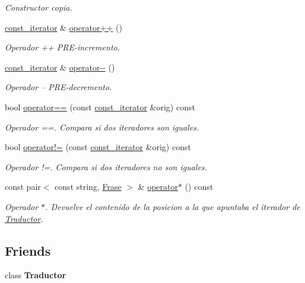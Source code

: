 \begin{DoxyCompactItemize}
\begin{DoxyCompactList}\small\item\em Constructor copia. \end{DoxyCompactList}\item 
\hyperlink{class_traductor_1_1const__iterator}{const\+\_\+iterator} \& \hyperlink{class_traductor_1_1const__iterator_adfb628ecd7e8558f3ea0719256468665}{operator++} ()
\begin{DoxyCompactList}\small\item\em Operador ++ P\+R\+E-\/incremento. \end{DoxyCompactList}\item 
\hyperlink{class_traductor_1_1const__iterator}{const\+\_\+iterator} \& \hyperlink{class_traductor_1_1const__iterator_aa7ca3b1d16ca9e227a0d94ca74f91dda}{operator-\/-\/} ()
\begin{DoxyCompactList}\small\item\em Operador -- P\+R\+E-\/decremento. \end{DoxyCompactList}\item 
bool \hyperlink{class_traductor_1_1const__iterator_a8d9900cfc2b73bb0a0985cbf9d3f0f89}{operator==} (const \hyperlink{class_traductor_1_1const__iterator}{const\+\_\+iterator} \&orig) const 
\begin{DoxyCompactList}\small\item\em Operador ==. Compara si dos iteradores son iguales. \end{DoxyCompactList}\item 
bool \hyperlink{class_traductor_1_1const__iterator_a5569019169be01c1bf0f81954e10a43f}{operator!=} (const \hyperlink{class_traductor_1_1const__iterator}{const\+\_\+iterator} \&orig) const 
\begin{DoxyCompactList}\small\item\em Operador !=. Compara si dos iteradores no son iguales. \end{DoxyCompactList}\item 
const pair$<$ const string, \hyperlink{class_frase}{Frase} $>$ \& \hyperlink{class_traductor_1_1const__iterator_a16713124baa5eef822858d7c8b223473}{operator$\ast$} () const 
\begin{DoxyCompactList}\small\item\em Operador $\ast$. Devuelve el contenido de la posicion a la que apuntaba el iterador de \hyperlink{class_traductor}{Traductor}. \end{DoxyCompactList}\end{DoxyCompactItemize}
\subsection*{Friends}
\begin{DoxyCompactItemize}
\item 
class {\bfseries Traductor}\hypertarget{class_traductor_1_1const__iterator_a64cc3a4ae136f1dbc0435fd0eb54cac0}{}\label{class_traductor_1_1const__iterator_a64cc3a4ae136f1dbc0435fd0eb54cac0}

\end{DoxyCompactItemize}


